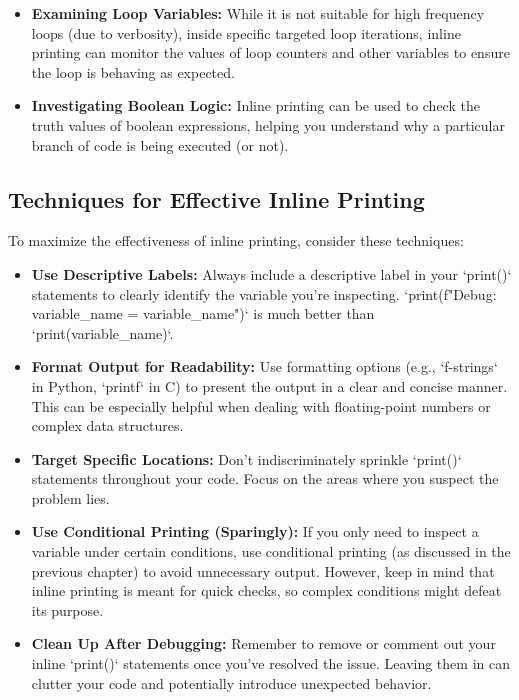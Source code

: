 \documentclass{article}
\begin{document}
{{{{\begin{itemize}
    \item \textbf{Examining Loop Variables:}  While it is not suitable for high frequency loops (due to verbosity), inside specific targeted loop iterations, inline printing can monitor the values of loop counters and other variables to ensure the loop is behaving as expected.

    \item \textbf{Investigating Boolean Logic:} Inline printing can be used to check the truth values of boolean expressions, helping you understand why a particular branch of code is being executed (or not).
\end{itemize}

\subsection*{Techniques for Effective Inline Printing}

To maximize the effectiveness of inline printing, consider these techniques:

\begin{itemize}
    \item \textbf{Use Descriptive Labels:} Always include a descriptive label in your `print()` statements to clearly identify the variable you're inspecting.  `print(f"Debug: variable_name = {variable_name}")` is much better than `print(variable_name)`.

    \item \textbf{Format Output for Readability:} Use formatting options (e.g., `f-strings` in Python, `printf` in C) to present the output in a clear and concise manner. This can be especially helpful when dealing with floating-point numbers or complex data structures.

    \item \textbf{Target Specific Locations:} Don't indiscriminately sprinkle `print()` statements throughout your code. Focus on the areas where you suspect the problem lies.

    \item \textbf{Use Conditional Printing (Sparingly):} If you only need to inspect a variable under certain conditions, use conditional printing (as discussed in the previous chapter) to avoid unnecessary output. However, keep in mind that inline printing is meant for quick checks, so complex conditions might defeat its purpose.

    \item \textbf{Clean Up After Debugging:}  Remember to remove or comment out your inline `print()` statements once you've resolved the issue. Leaving them in can clutter your code and potentially introduce unexpected behavior.


\end{itemize}}}}}
\end{document}
